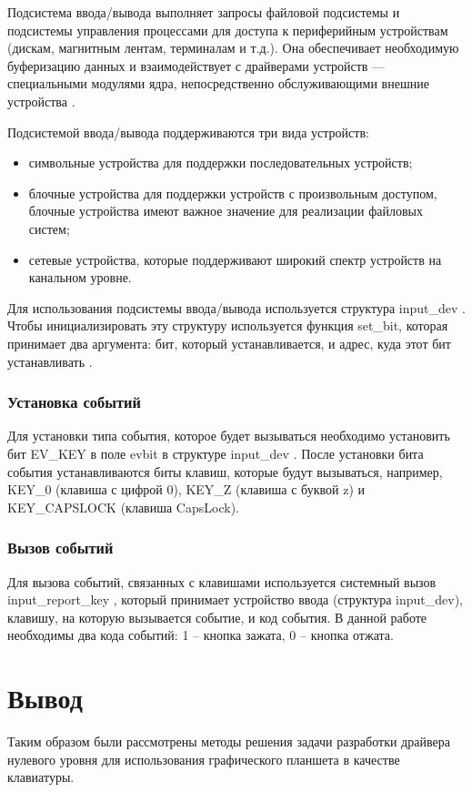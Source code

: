 Подсистема ввода/вывода выполняет запросы файловой подсистемы и подсистемы управления процессами для доступа к периферийным устройствам (дискам, магнитным лентам, терминалам и т.д.). Она обеспечивает необходимую буферизацию данных и взаимодействует с драйверами устройств — специальными модулями ядра, непосредственно обслуживающими внешние устройства \cite{Subsystem}.

Подсистемой ввода/вывода поддерживаются три вида устройств:

\begin{itemize}
    \item символьные устройства для поддержки последовательных устройств;
    \item блочные устройства для поддержки устройств с произвольным доступом, блочные устройства имеют важное значение для реализации файловых систем;
    \item сетевые устройства, которые поддерживают широкий спектр устройств на канальном уровне.
\end{itemize}

Для использования подсистемы ввода/вывода используется структура input\_dev \cite{Input_dev}. Чтобы инициализировать эту структуру используется функция set\_bit, которая принимает два аргумента: бит, который устанавливается, и адрес, куда этот бит устанавливать \cite{Setbit}.

\subsubsection{Установка событий}

Для установки типа события, которое будет вызываться необходимо установить бит EV\_KEY \cite{EVkey} в поле evbit в структуре input\_dev \cite{Input_dev}. После установки бита события устанавливаются биты клавиш, которые будут вызываться, например, KEY\_0 (клавиша с цифрой 0), KEY\_Z (клавиша с буквой z) и KEY\_CAPSLOCK (клавиша CapsLock).

\subsubsection{Вызов событий}

Для вызова событий, связанных с клавишами используется системный вызов input\_report\_key \cite{Input_report_key}, который принимает устройство ввода (структура input\_dev), клавишу, на которую вызывается событие, и код события. В данной работе необходимы два кода событий: 1 -- кнопка зажата, 0 -- кнопка отжата.

\section{Вывод}

Таким образом были рассмотрены методы решения задачи разработки драйвера нулевого уровня для использования графического планшета в качестве клавиатуры.
